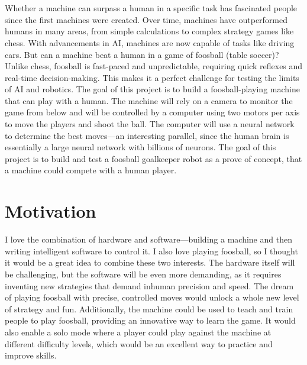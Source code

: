 \section*{~}
Whether a machine can surpass a human in a specific task has fascinated people since the first machines were created.
Over time, machines have outperformed humans in many areas, from simple calculations to complex strategy games like chess.
With advancements in AI, machines are now capable of tasks like driving cars.
But can a machine beat a human in a game of foosball (table soccer)?
Unlike chess, foosball is fast-paced and unpredictable, requiring quick reflexes and real-time decision-making.
This makes it a perfect challenge for testing the limits of AI and robotics.
The goal of this project is to build a foosball-playing machine that can play with a human.
The machine will rely on a camera to monitor the game from below and will be controlled by a computer using two motors per axis to move the players and shoot the ball.
The computer will use a neural network to determine the best moves—an interesting parallel, since the human brain is essentially a large neural network with billions of neurons.
The goal of this project is to build and test a foosball goalkeeper robot as a prove of concept, that a machine could compete with a human player.

\section{Motivation}\label{sec:motivation}
I love the combination of hardware and software—building a machine and then writing intelligent software to control it.
I also love playing foosball, so I thought it would be a great idea to combine these two interests.
The hardware itself will be challenging, but the software will be even more demanding, as it requires inventing new strategies that demand inhuman precision and speed.
The dream of playing foosball with precise, controlled moves would unlock a whole new level of strategy and fun.
Additionally, the machine could be used to teach and train people to play foosball, providing an innovative way to learn the game.
It would also enable a solo mode where a player could play against the machine at different difficulty levels, which would be an excellent way to practice and improve skills.
